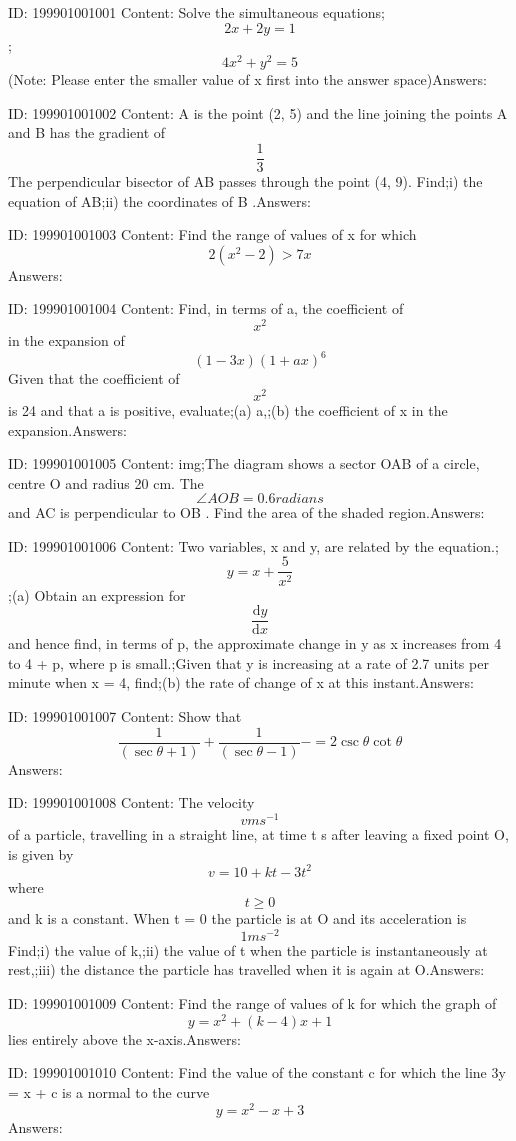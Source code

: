 \documentclass{article}
\begin{document}
ID: 199901001001
Content:
Solve the simultaneous equations; \[2x+2y=1\];\[4x^2+y^2=5\](Note: Please enter the smaller value of x first into the answer space)Answers:

ID: 199901001002
Content:
A is the point (2, 5) and the line joining the points A and B has the gradient of \[\frac{1}{3}\] The perpendicular bisector of AB passes through the point (4, 9). Find;i) the equation of AB;ii) the coordinates of B .Answers:

ID: 199901001003
Content:
Find the range of values of x for which \[2(x^2-2)>7x\]Answers:

ID: 199901001004
Content:
Find, in terms of a, the coefficient of \[x^2\] in the expansion of \[(1-3x)(1+ax)^6\] Given that the coefficient of \[x^2\] is 24 and that a is positive, evaluate;(a) a,;(b) the coefficient of x in the expansion.Answers:

ID: 199901001005
Content:
img;The diagram shows a sector OAB of a circle, centre O and radius 20 cm. The \[\angle AOB = 0.6 radians\]and AC is perpendicular to OB . Find the area of the shaded region.Answers:

ID: 199901001006
Content:
Two variables, x and y, are related by the equation.; \[y=x+\frac{5}{x^{2}}\];(a)	Obtain an expression for \[\frac{\mathrm{d} y}{\mathrm{d} x}\]and hence find, in terms of p, the approximate change in y as x increases from 4 to 4 + p, where p is small.;Given that y is increasing at a rate of 2.7 units per minute when x = 4, find;(b)	the rate of change of x at this instant.Answers:

ID: 199901001007
Content:
Show that \[\frac{1}{(\sec\theta+1)}+\frac{1}{(\sec\theta-1)}-=2\csc\theta\cot\theta\]Answers:

ID: 199901001008
Content:
The velocity \[vms^{-1}\] of a particle, travelling in a straight line, at time t s after leaving a fixed point O, is given by \[v=10+kt-3t^2\] where \[t\geq 0\] and k is a constant. When t = 0 the particle is at O and its acceleration is \[1 ms^{-2}\] Find;i) the value of k,;ii) the value of t when the particle is instantaneously at rest,;iii) the distance the particle has travelled when it is again at O.Answers:

ID: 199901001009
Content:
Find the range of values of k for which the graph of \[y=x^2+(k-4)x+1\] lies entirely above the x-axis.Answers:

ID: 199901001010
Content:
Find the value of the constant c for which the line 3y = x + c is a normal to the curve \[y=x^2-x+3\]Answers:
\end{document}
